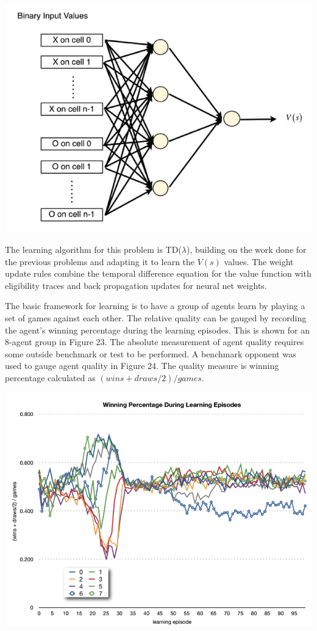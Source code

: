 \documentclass[11pt]{article} %
\begin{document}
\center
\includegraphics[scale=0.8]{fig11}
\begin{flushleft}

The learning algorithm for this problem is TD($\lambda$), building on the work done for the previous problems and adapting it to learn the $V(s)$ values.  The weight update rules combine the temporal difference equation for the value function with eligibility traces and back propagation updates for neural net weights.

The basic framework for learning is to have a group of agents learn by playing a set of games against each other.  The relative quality can be gauged by recording the agent’s winning percentage during the learning episodes.  This is shown for an 8-agent group in Figure 23.  The absolute measurement of agent quality requires some outside benchmark or test to be performed.  A benchmark opponent was used to gauge agent quality in Figure 24.  The quality measure is winning percentage calculated as $(wins + draws/2)/games$.

\end{flushleft}
\center
\includegraphics[scale=0.8]{fig12}
\end{document}
